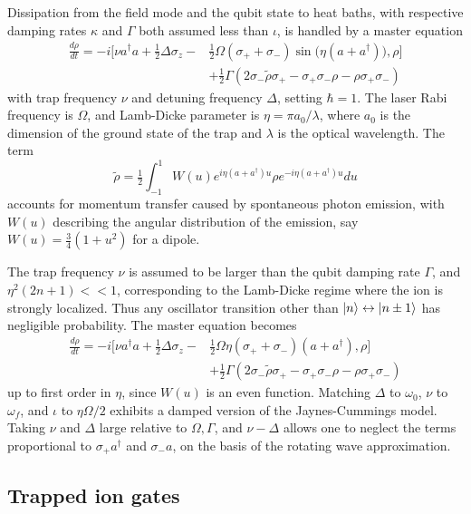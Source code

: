 \documentclass[12pt,a4paper]{amsart}
\numberwithin{equation}{section}
\theoremstyle{plain}
\theoremstyle{definition}
\begin{document}
Dissipation from the field mode and the qubit state to heat baths, with respective damping rates $\kappa$ and $\Gamma$ both assumed less than $\iota$, is handled by a master equation
\begin{align*}
 \frac{d\rho}{dt} = -i\Big[\nu a^{\dagger}a + \tfrac12{\Delta \sigma_z} -& \tfrac12{\Omega}(\sigma_+ + \sigma_-)\sin\big(\eta(a+a^{\dagger})\big),\rho\Big]
 \\& + \tfrac12{\Gamma}(2\sigma_-\widetilde{\rho}\sigma_+ - \sigma_+\sigma_-\rho-\rho\sigma_+\sigma_-)
\end{align*}
 with trap frequency $\nu$ and detuning frequency $\Delta$, setting $\hbar=1$. 
The laser Rabi frequency is $\Omega$, and Lamb-Dicke parameter is $\eta = {\pi a_0}/{\lambda}$, where $a_0$ is the dimension of the ground state of the trap and $\lambda$ is the optical wavelength. The term
$$
\widetilde{\rho} = \tfrac{1}{2}\int_{-1}^1 W(u)e^{i\eta (a+a^{\dagger})u}\rho e^{-i \eta (a+a^{\dagger})u}du
$$
accounts for momentum transfer caused by spontaneous photon emission, with $W(u)$ describing the angular distribution of the emission, say $W(u)=\tfrac34(1+u^2)$ for a dipole.


The trap frequency $\nu$ is assumed to be larger than the qubit damping rate $\Gamma$, and $\eta^2(2n+1)<\!\!<1$, corresponding to the Lamb-Dicke regime where the ion is strongly localized. Thus any oscillator transition other than $\ket{n} \leftrightarrow \ket{n\pm 1}$ has negligible probability. The master equation becomes 
\begin{align*}
 \frac{d\rho}{dt} = -i\Big[\nu a^{\dagger}a + \tfrac12{\Delta \sigma_z} -& \tfrac12{\Omega}\eta(\sigma_+ + \sigma_-)(a+a^{\dagger}),\rho\Big]
 \\& + \tfrac12{\Gamma}(2\sigma_-\widetilde{\rho}\sigma_+ - \sigma_+\sigma_-\rho-\rho\sigma_+\sigma_-)
\end{align*}
up to first order in $\eta$, since $W(u)$ is an even function. Matching $\Delta$ to $\omega_0$, $\nu$ to $\omega_f$, and $\iota$ to $\eta\Omega/2$ exhibits a damped version of the Jaynes-Cummings model. Taking $\nu$ and $\Delta$ large relative to $\Omega, \Gamma$, and $\nu-\Delta$ allows one to neglect the terms proportional to $\sigma_+ a^{\dagger}$ and $\sigma_-a$, on the basis of the rotating wave approximation.  



\subsection{Trapped ion gates}
\end{document}
